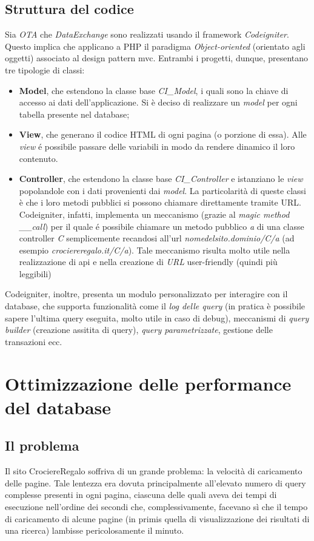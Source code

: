 \subsection{Struttura del codice}
Sia \textit{OTA} che \textit{DataExchange} sono realizzati usando il framework \textit{Codeigniter}. Questo implica che applicano a PHP il paradigma \textit{Object-oriented} (orientato agli oggetti) associato al design pattern \gls{mvc}. Entrambi i progetti, dunque, presentano tre tipologie di classi:
\begin{itemize}
	\item \textbf{Model}, che estendono la classe base \textit{CI\_Model}, i quali sono la chiave di accesso ai dati dell'applicazione. Si è deciso di realizzare un \textit{model} per ogni tabella presente nel database;
	\item \textbf{View}, che generano il codice HTML di ogni pagina (o porzione di essa). Alle \textit{view} é possibile passare delle variabili in modo da rendere dinamico il loro contenuto.
	\item \textbf{Controller}, che estendono la classe base \textit{CI\_Controller} e istanziano le \textit{view} popolandole con i dati provenienti dai \textit{model}. La particolarità di queste classi è che i loro metodi pubblici si possono chiamare direttamente tramite URL. Codeigniter, infatti, implementa un meccanismo (grazie al \textit{magic method \_\_call}) per il quale é possibile chiamare un metodo pubblico \textit{a} di una classe controller \textit{C} semplicemente recandosi all'url \textit{nomedelsito.dominio/C/a} (ad esempio \textit{crociereregalo.it/C/a}). Tale meccanismo risulta molto utile nella realizzazione di \gls{api} e nella creazione di \textit{URL} user-friendly (quindi più leggibili)
\end{itemize} 
Codeigniter, inoltre, presenta un modulo personalizzato per interagire con il database, che supporta funzionalità come il \textit{log delle query} (in pratica è possibile sapere l'ultima query eseguita, molto utile in caso di debug), meccanismi di \textit{query builder} (creazione assitita di query), \textit{query parametrizzate}, gestione delle transazioni ecc.

\section{Ottimizzazione delle performance del database}
\subsection{Il problema}
Il sito CrociereRegalo soffriva di un grande problema: la velocità di caricamento delle pagine. Tale lentezza era dovuta principalmente all'elevato numero di query complesse presenti in ogni pagina, ciascuna delle quali aveva dei tempi di esecuzione nell'ordine dei secondi che, complessivamente, facevano sì che il tempo di caricamento di alcune pagine (in primis quella di visualizzazione dei risultati di una ricerca) lambisse pericolosamente il minuto.
